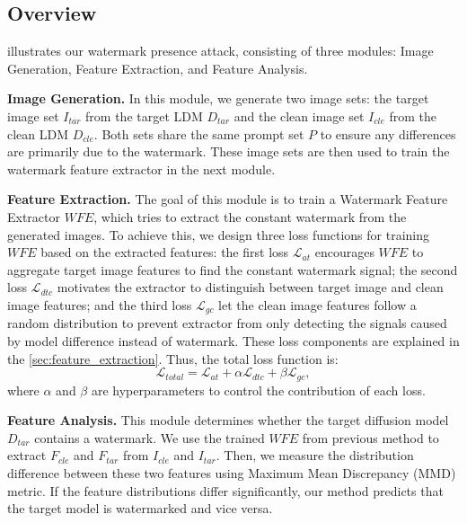 \subsection{Overview}
\label{sec:wpa_overview}
 illustrates our watermark presence attack, consisting of three modules: Image Generation, Feature Extraction, and Feature Analysis.

\textbf{Image Generation.} In this module, we generate two image sets: the target image set \(I_{tar}\) from the target LDM \(D_{tar}\) and the clean image set \(I_{cle}\) from the clean LDM \(D_{cle}\). Both sets share the same prompt set \(P\) to ensure any differences are primarily due to the watermark. These image sets are then used to train the watermark feature extractor in the next module.

\textbf{Feature Extraction.} The goal of this module is to train a Watermark Feature Extractor $WFE$, which tries to extract the constant watermark from the generated images. To achieve this, we design three loss functions for training $WFE$ based on the extracted features: the first loss \(\mathcal{L}_{at}\) encourages $WFE$ to aggregate target image features to find the constant watermark signal; the second loss \(\mathcal{L}_{dtc}\) motivates the extractor 
to distinguish between target image and clean image features; and the third loss \(\mathcal{L}_{gc}\) let the clean image features follow a random distribution to prevent extractor from only detecting the signals caused by model difference instead of watermark. These loss components are explained in the \cref{sec:feature_extraction}. Thus, the total loss function is:
\begin{equation}
\mathcal{L}_{{total}} = \mathcal{L}_{at} + \alpha\mathcal{L}_{dtc} + \beta\mathcal{L}_{gc},
\end{equation}
where \(\alpha\) and \(\beta\) are hyperparameters to control the contribution of each loss. 

\textbf{Feature Analysis.} This module determines whether the target diffusion model \( D_{tar} \) contains a watermark. We use the trained  $WFE$ from previous method to extract  \( F_{cle} \) and \( F_{tar} \) from  \( I_{cle} \) and  \( I_{tar} \). Then, we measure the distribution difference between these two features using Maximum Mean Discrepancy (MMD) \cite{MMD} metric. If the feature distributions differ significantly, our method predicts that the target model is watermarked and vice versa. 



